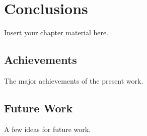 
\chapter{Conclusions}
\label{chapter:conclusions}

Insert your chapter material here.


\section{Achievements}
\label{section:achievements}

The major achievements of the present work.


\section{Future Work}
\label{section:future}

A few ideas for future work.

